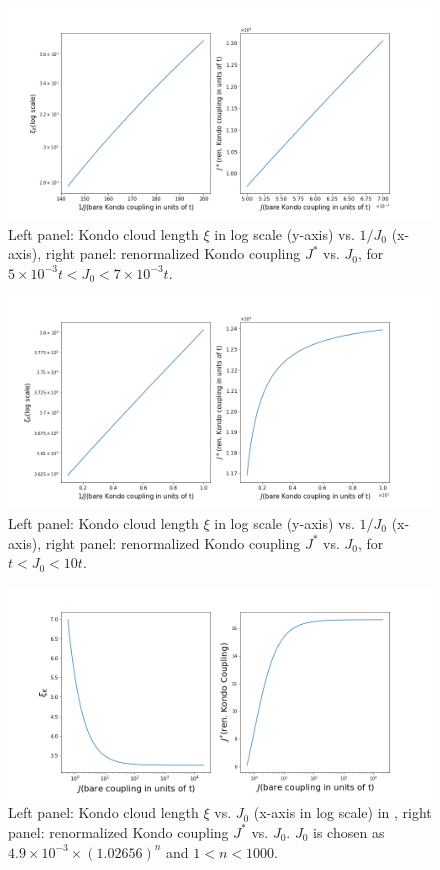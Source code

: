 \documentclass[aps,prl,preprint,groupedaddress]{revtex4-2}
\begin{document}
\begin{figure}
\includegraphics[width=\textwidth]{KondoRegime1.png}
\caption{Left panel: Kondo cloud length $\xi$ in log scale (y-axis) vs. $1/J_{0}$ (x-axis), right panel: renormalized Kondo coupling $J^{*}$ vs. $J_{0}$, for $5\times 10^{-3}t<J_{0}<7\times 10^{-3}t$.}\label{weak}
\end{figure}
\begin{figure}
\includegraphics[width=\textwidth]{KondoRegime3.png}
\caption{Left panel: Kondo cloud length $\xi$ in log scale (y-axis) vs. $1/J_{0}$ (x-axis), right panel: renormalized Kondo coupling $J^{*}$ vs. $J_{0}$, for $t<J_{0}<10t$.}
\label{intermediate}
\end{figure}
\begin{figure}
\includegraphics[width=\textwidth]{KondoComplete.png}
\caption{Left panel: Kondo cloud length $\xi$ vs. $J_{0}$ (x-axis in log scale) in , right panel: renormalized Kondo coupling $J^{*}$ vs. $J_{0}$. $J_{0}$ is chosen as $4.9\times 10^{-3}\times(1.02656)^{n}$ and $1<n<1000$.}\label{strong}
\end{figure}
\end{document}
